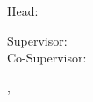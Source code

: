 

\begin{titlepage}


%

\begin{center}
~
\vfill\vfill\vfill

\THSinsertauthor

\vfill

{\LARGE\bfseries\THSinserttitle}

\vfill\vfill\vfill

{\bfseries\THSinsertworktitle}

\vfill\vfill\vfill
\vfill\vfill\vfill
\vfill\vfill\vfill

\THSinsertuniversity

\vfill

\THSinsertinstitute\\
\ifx\THSinsertinstitutehead\empty\else
Head: \THSinsertinstitutehead\\
\fi

\vfill

\ifx\THSinsertsupervisor\empty\else
  Supervisor: \THSinsertsupervisor\\
\fi
\ifx\THSinsertcosupervisor\empty\else
	Co-Supervisor: \THSinsertcosupervisor\\
\fi

\vfill

\ifx\THSinsertsubmissiontown\empty\else
\THSinsertsubmissiontown,~%
\fi
\ifx\THSinsertsubmissionmonth\empty\else
\THSinsertsubmissionmonth~%
\fi
\THSinsertsubmissionyear

\end{center}
\end{titlepage}

\newpage


